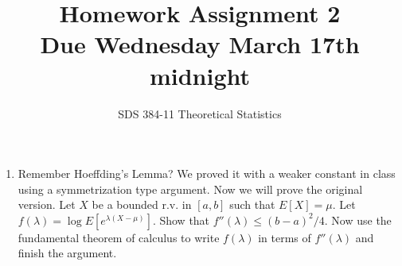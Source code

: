 \documentclass[11pt]{article}
\newcommand{\var}{\text{var}}
\begin{document}
\title{{\bf Homework Assignment 2}\\Due Wednesday March 17th midnight}
\author{SDS 384-11 Theoretical Statistics}

\date{}

\maketitle{}
\begin{enumerate}%


\item Remember Hoeffding's Lemma? We proved it with a weaker constant in class using a symmetrization type argument. Now we will prove the original version. Let $X$ be a bounded r.v. in $[a,b]$ such that $E[X]=\mu$.
Let $f(\lambda)=\log E[e^{\lambda(X-\mu)}]$. Show that $f''(\lambda)\leq (b-a)^2/4$. Now use the fundamental theorem of calculus to write $f(\lambda)$ in terms of $f''(\lambda)$ and finish the argument.
\iffalse
\item Consider a r.v. $X$ such that for all $\lambda\in \Re$
\begin{align}
E[e^{\lambda X}]\leq e^{\frac{\lambda^2\sigma^2}{2}+\lambda\mu}
\end{align}
Prove that:
\begin{enumerate}
	\item $E[X]=\mu$.
	\item $\var(X)\leq \sigma^2$.
	\item If the smallest value of $\sigma$ satisfying the above equation is chosen, is it true that $\var(X)=\sigma^2$? Prove or give a counter example.
\end{enumerate}
\fi


\end{enumerate}
\end{document}

